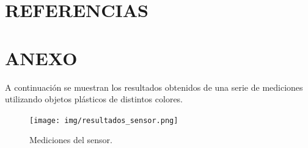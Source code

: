 \documentclass[12pt,a4paper,twoside,fleqn]{article}
\begin{document}
\section*{REFERENCIAS}



\newpage
\section*{ANEXO}
A continuación se muestran los resultados obtenidos de una serie de mediciones utilizando objetos plásticos de distintos colores.
\begin{figure}
    \centering
    \texttt{[image: img/resultados\_sensor.png]}
    \caption{Mediciones del sensor.}
    \label{fig:resultados}
\end{figure}
\end{document}
